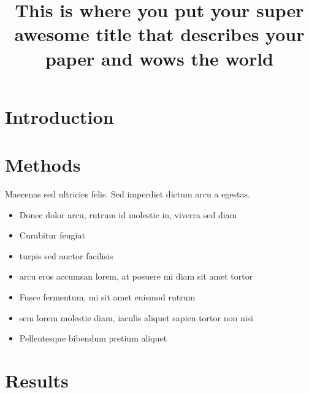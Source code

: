 \documentclass[12pt]{article}
\title{\large This is where you put your super awesome title that describes your paper and wows the world}
\author{}
\date{} %
\begin{document}
\maketitle



\begin{abstract} %

\noindent \lipsum[1] %

\end{abstract}


\section{Introduction}

\lipsum[2-3] %


\section{Methods}

Maecenas sed ultricies felis. Sed imperdiet dictum arcu a egestas.
\begin{itemize}
\item Donec dolor arcu, rutrum id molestie in, viverra sed diam
\item Curabitur feugiat
\item turpis sed auctor facilisis
\item arcu eros accumsan lorem, at posuere mi diam sit amet tortor
\item Fusce fermentum, mi sit amet euismod rutrum
\item sem lorem molestie diam, iaculis aliquet sapien tortor non nisi
\item Pellentesque bibendum pretium aliquet
\end{itemize} 
\lipsum[4] %


\section{Results}
\end{document}
